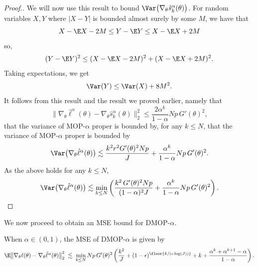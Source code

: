 \begin{proof}[Proof.]
We will now use this result to bound $\Var\big(\nabla_\theta \hat s_k^\alpha(\theta)\big)$. 
For random variables $X,Y$ where $|X-Y|$ is bounded almost surely by some $M$, we have that 
\begin{equation}
X-\E X - 2M \leq Y - \E Y \leq X - \E X + 2M\end{equation}
so,
\begin{equation}
(Y-\E Y)^2 \leq (X-\E X - 2M)^2 + (X-\E X +2M)^2.\end{equation}
Taking expectations, we get
\begin{equation}
\Var(Y) \leq \Var(X) + 8M^2.
\end{equation}
It follows from this result and the result we proved earlier, namely that
\begin{equation}
\big\|\nabla_\theta\hat\ell^\alpha(\theta) - \nabla_\theta \hat s_k^\alpha(\theta)\big\|_2^2 \leq \frac{2\alpha^k}{1-\alpha}Np \, G'(\theta)^2,
\end{equation}
that the variance of MOP-$\alpha$ proper is bounded by, for any $k \leq N$,
that the variance of MOP-$\alpha$ proper is bounded by
\begin{equation}
\Var\big(\nabla_\theta \hat\ell^\alpha(\theta)\big) \lesssim \frac{k^2r^2G'(\theta)^2Np}{J} + \frac{\alpha^{k}}{1-\alpha}Np \, G'(\theta)^2.
\end{equation}
As the above holds for any $k \leq N$,
\begin{equation}
\Var\big(\nabla_\theta \hat\ell^\alpha(\theta)\big) \lesssim \min_{k\leq N} \left(\frac{k^2 \, G'(\theta)^2Np}{(1-\alpha)^2J} + \frac{\alpha^{k}}{1-\alpha}Np \, G'(\theta)^2 \right).\end{equation}
\end{proof}
We now proceed to obtain an MSE bound for DMOP-$\alpha$.
\begin{thm}
    When $\alpha \in (0,1)$, the MSE of DMOP-$\alpha$ is given by
    \begin{equation}
        \E\big\|\nabla_\theta\ell(\theta) - \nabla_\theta \hat\ell^\alpha(\theta)\big\|_2^2 \; \lesssim \; \min_{k \leq N} Np \, G'(\theta)^2\left(\frac{k^2}{J}+(1-\epsilon)^{\floor{k/(c\log(J))}}+k+\frac{\alpha^k  + \alpha^{k+1} - \alpha}{1-\alpha}\right).
        \nonumber
    \end{equation}
\end{thm}
